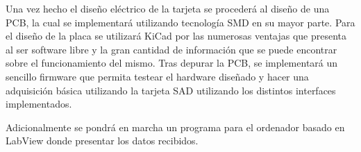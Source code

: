 Una vez hecho el diseño eléctrico de la tarjeta se procederá al diseño de una PCB, la cual se implementará utilizando tecnología SMD en su mayor parte. Para el diseño de la placa se utilizará KiCad por las numerosas ventajas que presenta al ser software libre y la gran cantidad de información que se puede encontrar sobre el funcionamiento del mismo.
Tras depurar la PCB, se implementará un sencillo firmware que permita testear el hardware diseñado y hacer una adquisición básica utilizando la tarjeta SAD utilizando los distintos interfaces implementados.

Adicionalmente se pondrá en marcha un programa para el ordenador basado en LabView donde presentar los datos recibidos.
